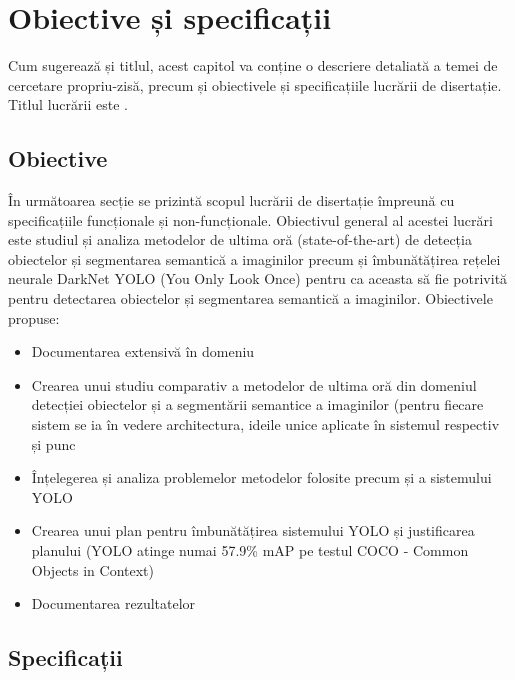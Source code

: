 \chapter{Obiective și specificații}
\label{cap:obiective-specificatii}
Cum sugerează și titlul, acest capitol va conține o descriere detaliată a temei de cercetare propriu-zisă, precum și obiectivele și specificațiile lucrării de disertație. Titlul lucrării este \textit{\thesistitle}.\newline

\section{Obiective}
În următoarea secție se prizintă scopul lucrării de disertație împreună cu specificațiile funcționale și non-funcționale.\newline
Obiectivul general al acestei lucrări este studiul și analiza metodelor de ultima oră (state-of-the-art) de detecția obiectelor și segmentarea semantică a imaginilor precum și îmbunătățirea rețelei neurale DarkNet YOLO  \cite{DBLP:journals/corr/abs-1804-02767} (You Only Look Once)  pentru ca aceasta să fie potrivită pentru detectarea obiectelor și segmentarea semantică a imaginilor. Obiectivele propuse:
\begin{itemize}
	\item Documentarea extensivă în domeniu
	\item Crearea unui studiu comparativ a metodelor de ultima oră din domeniul detecției obiectelor și a segmentării semantice a imaginilor (pentru fiecare sistem se ia în vedere architectura, ideile unice aplicate în sistemul respectiv și punc
	\item Înțelegerea și analiza problemelor metodelor folosite precum și a sistemului YOLO
	\item Crearea unui plan pentru îmbunătățirea sistemului YOLO și justificarea planului (YOLO atinge numai 57.9\% mAP pe testul COCO - Common Objects in Context)
	\item Documentarea rezultatelor
\end{itemize}

\section{Specificații}
